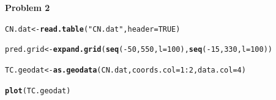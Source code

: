 \documentclass{article}\usepackage[]{graphicx}\usepackage[]{color}
\makeatletter
\newcommand{\hlnum}[1]{\textcolor[rgb]{0.686,0.059,0.569}{#1}}%
\newcommand{\hlstr}[1]{\textcolor[rgb]{0.192,0.494,0.8}{#1}}%
\newcommand{\hlopt}[1]{\textcolor[rgb]{0,0,0}{#1}}%
\newcommand{\hlstd}[1]{\textcolor[rgb]{0.345,0.345,0.345}{#1}}%
\newcommand{\hlkwb}[1]{\textcolor[rgb]{0.69,0.353,0.396}{#1}}%
\newcommand{\hlkwc}[1]{\textcolor[rgb]{0.333,0.667,0.333}{#1}}%
\newcommand{\hlkwd}[1]{\textcolor[rgb]{0.737,0.353,0.396}{\textbf{#1}}}%
\newenvironment{kframe}{%
 \def\at@end@of@kframe{}%
 \ifinner\ifhmode%
  \def\at@end@of@kframe{\end{minipage}}%
  \begin{minipage}{\columnwidth}%
 \fi\fi%
 \def\FrameCommand##1{\hskip\@totalleftmargin \hskip-\fboxsep
 \colorbox{shadecolor}{##1}\hskip-\fboxsep
     \hskip-\linewidth \hskip-\@totalleftmargin \hskip\columnwidth}%
 \MakeFramed {\advance\hsize-\width
   \@totalleftmargin\z@ \linewidth\hsize
   \@setminipage}}%
 {\par\unskip\endMakeFramed%
 \at@end@of@kframe}
\newenvironment{knitrout}{}{} %
\makeatother
\begin{document}
{\bf Problem 2}

\begin{knitrout}\footnotesize
{}\color{fgcolor}\begin{kframe}
\begin{alltt}
\hlstd{CN.dat} \hlkwb{<-} \hlkwd{read.table}\hlstd{(}\hlstr{"CN.dat"}\hlstd{,} \hlkwc{header} \hlstd{=} \hlnum{TRUE}\hlstd{)}

\hlstd{pred.grid}\hlkwb{<-}\hlkwd{expand.grid}\hlstd{(}\hlkwd{seq}\hlstd{(}\hlopt{-}\hlnum{50}\hlstd{,}\hlnum{550}\hlstd{,}\hlkwc{l}\hlstd{=}\hlnum{100}\hlstd{),}\hlkwd{seq}\hlstd{(}\hlopt{-}\hlnum{15}\hlstd{,}\hlnum{330}\hlstd{,}\hlkwc{l}\hlstd{=}\hlnum{100}\hlstd{))}

\hlstd{TC.geodat}\hlkwb{<-}\hlkwd{as.geodata}\hlstd{(CN.dat,}\hlkwc{coords.col}\hlstd{=}\hlnum{1}\hlopt{:}\hlnum{2}\hlstd{,}\hlkwc{data.col}\hlstd{=}\hlnum{4}\hlstd{)}
\end{alltt}
\end{kframe}
\end{knitrout}
\begin{knitrout}\footnotesize
{}\color{fgcolor}\begin{kframe}
\begin{alltt}
\hlkwd{plot}\hlstd{(TC.geodat)}
\end{alltt}
\end{kframe}
\end{knitrout}
\end{document}
